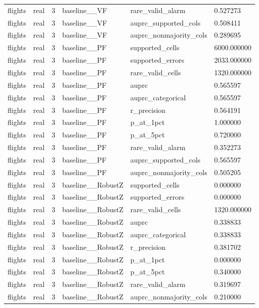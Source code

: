 \begin{tabular}{llllll}
flights & real & 3 & baseline\_\_VF & rare\_valid\_alarm & 0.527273 \\
flights & real & 3 & baseline\_\_VF & auprc\_supported\_cols & 0.508411 \\
flights & real & 3 & baseline\_\_VF & auprc\_nonmajority\_cols & 0.289695 \\
flights & real & 3 & baseline\_\_PF & supported\_cells & 6000.000000 \\
flights & real & 3 & baseline\_\_PF & supported\_errors & 2033.000000 \\
flights & real & 3 & baseline\_\_PF & rare\_valid\_cells & 1320.000000 \\
flights & real & 3 & baseline\_\_PF & auprc & 0.565597 \\
flights & real & 3 & baseline\_\_PF & auprc\_categorical & 0.565597 \\
flights & real & 3 & baseline\_\_PF & r\_precision & 0.564191 \\
flights & real & 3 & baseline\_\_PF & p\_at\_1pct & 1.000000 \\
flights & real & 3 & baseline\_\_PF & p\_at\_5pct & 0.720000 \\
flights & real & 3 & baseline\_\_PF & rare\_valid\_alarm & 0.352273 \\
flights & real & 3 & baseline\_\_PF & auprc\_supported\_cols & 0.565597 \\
flights & real & 3 & baseline\_\_PF & auprc\_nonmajority\_cols & 0.505205 \\
flights & real & 3 & baseline\_\_RobustZ & supported\_cells & 0.000000 \\
flights & real & 3 & baseline\_\_RobustZ & supported\_errors & 0.000000 \\
flights & real & 3 & baseline\_\_RobustZ & rare\_valid\_cells & 1320.000000 \\
flights & real & 3 & baseline\_\_RobustZ & auprc & 0.338833 \\
flights & real & 3 & baseline\_\_RobustZ & auprc\_categorical & 0.338833 \\
flights & real & 3 & baseline\_\_RobustZ & r\_precision & 0.381702 \\
flights & real & 3 & baseline\_\_RobustZ & p\_at\_1pct & 0.000000 \\
flights & real & 3 & baseline\_\_RobustZ & p\_at\_5pct & 0.340000 \\
flights & real & 3 & baseline\_\_RobustZ & rare\_valid\_alarm & 0.319697 \\
flights & real & 3 & baseline\_\_RobustZ & auprc\_nonmajority\_cols & 0.210000 \\

\end{tabular}
